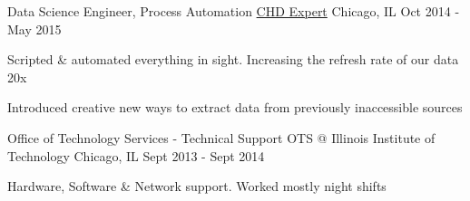 \begin{cventries}
  \cventry
    {Data Science Engineer, Process Automation} %
    {\href{https://www.chd-expert.com}{CHD Expert}} %
    {Chicago, IL} %
    {Oct 2014 - May 2015} %
    {
      \begin{cvitems} %
        \item {Scripted \& automated everything in sight. Increasing the refresh rate of our data 20x}
        \item {Introduced creative new ways to extract data from previously inaccessible sources}
      \end{cvitems}
    }

  \cventry
    {Office of Technology Services - Technical Support} %
    {{OTS @ Illinois Institute of Technology}} %
    {Chicago, IL} %
    {Sept 2013 - Sept 2014} %
    {
      \begin{cvitems} %
        \item {Hardware, Software \& Network support. Worked mostly night shifts}
      \end{cvitems}
    }
\end{cventries}
